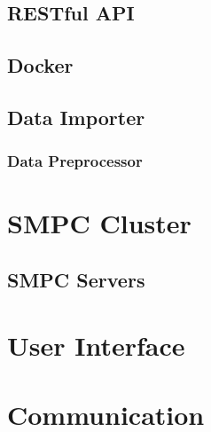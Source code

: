 \subsection{RESTful API}\label{ss:data-providers-restful-api}


\subsection{Docker}\label{ss:data-providers-docker}

\subsection{Data Importer}\label{ss:data-providers-importer}

\subsubsection{Data Preprocessor}\label{sss:data-providers-preprocessor}



\section{SMPC Cluster}\label{s:impl-smpc-cluster}

\subsection{SMPC Servers}\label{ss:smpc-cluster-servers}



\section{User Interface}\label{s:impl-ui}



\section{Communication}\label{s:impl-communication}

